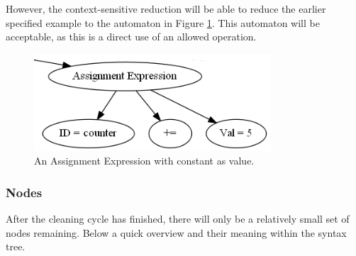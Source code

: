 \documentclass[12pt]{article}
\begin{document}
However, the context-sensitive reduction will be able to reduce the earlier specified example to the automaton in Figure \ref{fig:folded_addition}. This automaton will be acceptable, as this is a direct use of an allowed operation.

\begin{figure}[h]
	\centering
	\includegraphics[width=0.6\linewidth]{folded_addition}
	\caption{An Assignment Expression with constant as value.}
	\label{fig:folded_addition}
\end{figure}
\newpage
\subsubsection{Nodes}
After the cleaning cycle has finished, there will only be a relatively small set of nodes remaining. Below a quick overview and their meaning within the syntax tree.
\end{document}
